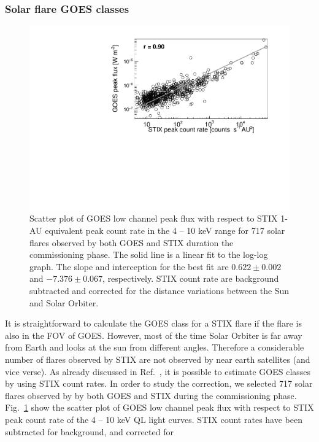\documentclass[referee]{aa} %
\begin{document}
\subsubsection{Solar flare GOES classes}
\begin{figure}
  \centering
  \includegraphics[width=0.8\linewidth]{figures/goes_stix_flux_paper.pdf}
  \caption{Scatter plot of GOES low channel peak flux with respect to STIX 1-AU equivalent  peak count rate in the 4 -- 10 keV range
  for 717 solar flares observed by both GOES and STIX duration the commissioning phase. 
  The solid line is a linear fit to the log-log graph. 
  The slope and 
  interception for the best fit are $0.622\pm 0.002$ and $-7.376\pm0.067$, respectively.
STIX count rate are background subtracted and corrected for the distance variations between the Sun and Solar Orbiter. 
}
\label{fig:goes-stix}
\end{figure}
It is straightforward to calculate the GOES
class for a STIX flare if the flare is also in the FOV of GOES. 
However,  most of the time Solar Orbiter is far away from Earth and looks at 
the sun from different angles. Therefore a considerable number of flares observed by STIX
 are not observed by near earth satellites (and vice verse). 
As already discussed in Ref.~\cite{andrea2021}, 
it is possible to estimate GOES classes by using STIX count rates.
In order to study the correction, we selected 717 solar flares observed by 
by both GOES  and   STIX during the commissioning phase.   
Fig.~\ref{fig:goes-stix} show the scatter plot of GOES low channel peak flux with respect to 
STIX peak count rate  of the 4 -- 10 keV QL light curves. 
STIX count rates  have been subtracted for background,  and corrected for 
\end{document}

